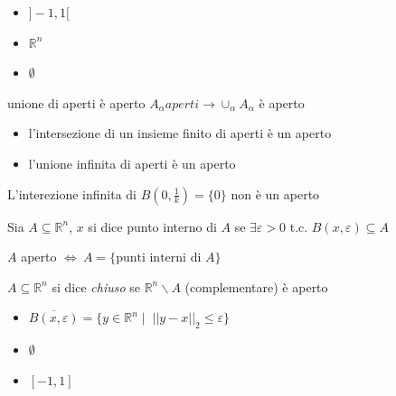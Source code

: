 \begin{example}
  \begin{itemize}
  \item  $ ] -1, 1 [$
  \item $\mathbb{R}^{n}$
  \item $\emptyset$
  \end{itemize}
\end{example}

\begin{property}
 unione di aperti è aperto
  $A_{\alpha} aperti \rightarrow \cup_{\alpha} A_{\alpha}$ è aperto
\end{property}

\begin{property}
\begin{itemize}
\item l'intersezione di un insieme finito di aperti è  un aperto
\item l'unione infinita di aperti è un aperto
\end{itemize}

\end{property}
L'interezione infinita di $B(0, \frac{1}{k}) = \{0\}$ non è un aperto

\begin{defn}
Sia $ A \subseteq \mathbb{R}^n$, $x$ si dice punto interno di $A$ se
$\exists \varepsilon > 0$ t.c. $B(x, \varepsilon) \subseteq A $
\end{defn}

\begin{property}
 $A$ aperto $\Longleftrightarrow ~ A=\{ \text{punti interni di  } A \}$
\end{property}

\begin{defn}[Chiuso]
$A \subseteq \mathbb{R}^{n}$ si dice \emph{chiuso} se
 $\mathbb{R}^{n} \backslash A$ (complementare) è aperto
\end{defn}

\begin{example}
  \begin{itemize}
  \item $ \overline{B(x, \varepsilon) } = \{ y \in \mathbb{R}^{n} \; | \;\;  ||y-x||_{2} \leq \varepsilon \}$
  \item $\emptyset$
  \item $[-1,1]$
  \end{itemize}
\end{example}

